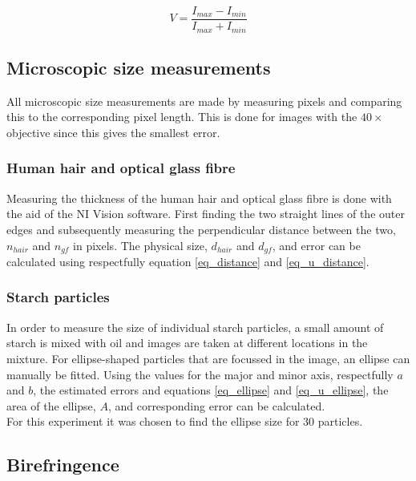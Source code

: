 \begin{equation}
  V = \frac{I_{max}-I_{min}}{I_{max}+I_{min}}
  \label{eq:visibility}
\end{equation}
\subsection{Microscopic size measurements}
All microscopic size measurements are made by measuring pixels and comparing this to the corresponding pixel length. This is done for images with the $40\times$ objective since this gives the smallest error.



\subsubsection*{Human hair and optical glass fibre}

Measuring the thickness of the human hair and optical glass fibre is done with the aid of the NI Vision software. First finding the two straight lines of the outer edges and subsequently measuring the perpendicular distance between the two, $n_{hair}$ and $n_{gf}$ in pixels. The physical size, $d_{hair}$ and $d_{gf}$, and error can be calculated using respectfully equation \ref{eq_distance} and \ref{eq_u_distance}.


\subsubsection*{Starch particles}

In order to measure the size of individual starch particles, a small amount of starch is mixed with oil and images are taken at different locations in the mixture. For ellipse-shaped particles that are focussed in the image, an ellipse can manually be fitted. Using the values for the major and minor axis, respectfully $a$ and $b$, the estimated errors and equations \ref{eq_ellipse} and \ref{eq_u_ellipse}, the area of the ellipse, $A$, and corresponding error can be calculated.\\
For this experiment it was chosen to find the ellipse size for 30 particles.


\subsection{Birefringence}

